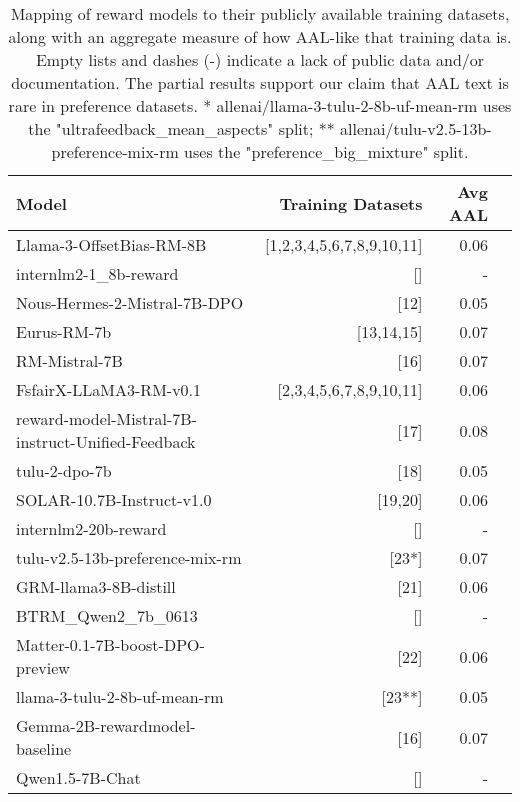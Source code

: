 \begin{table*}[h]
\small
\begin{center}
\begin{tabular}{lrrr}
\toprule
\textbf{Model} & \textbf{Training Datasets} & \textbf{Avg AAL} \\
\midrule
Llama-3-OffsetBias-RM-8B \cite{park2024offsetbias} & [1,2,3,4,5,6,7,8,9,10,11] & 0.06 \\
internlm2-1\_8b-reward \cite{cai2024internlm2} & [] & - \\
Nous-Hermes-2-Mistral-7B-DPO \cite{Nous-Hermes-2-Mistral-7B-DPO} & [12] & 0.05 \\
Eurus-RM-7b \cite{yuan2024advancing} & [13,14,15] & 0.07 \\
RM-Mistral-7B \cite{dong2023raft, xiong2024iterative} & [16] & 0.07 \\
FsfairX-LLaMA3-RM-v0.1 \cite{dong2023raft, xiong2024iterative} & [2,3,4,5,6,7,8,9,10,11] & 0.06 \\
reward-model-Mistral-7B-instruct-Unified-Feedback \cite{yang2024regularizing} & [17] & 0.08 \\
tulu-2-dpo-7b \cite{ivison2023camels} & [18] & 0.05 \\
SOLAR-10.7B-Instruct-v1.0 \cite{kim2023solar, kim2024sdpo} & [19,20] & 0.06 \\
internlm2-20b-reward \cite{cai2024internlm2} & [] & - \\
tulu-v2.5-13b-preference-mix-rm \cite{ivison2024unpacking} & [23*] & 0.07 \\
GRM-llama3-8B-distill \cite{yang2024regularizing} & [21] & 0.06 \\
BTRM\_Qwen2\_7b\_0613 \cite{qwen2} & [] & - \\
Matter-0.1-7B-boost-DPO-preview \cite{jiang2023mistral} & [22] & 0.06 \\
llama-3-tulu-2-8b-uf-mean-rm \cite{ivison2024unpacking} & [23**] & 0.05 \\
Gemma-2B-rewardmodel-baseline \cite{yang2024regularizing} & [16] & 0.07 \\
Qwen1.5-7B-Chat \cite{qwen} & [] & - \\
\bottomrule
\end{tabular}
\caption{Mapping of reward models to their publicly available training datasets, along with an aggregate measure of how AAL-like that training data is. Empty lists and dashes (-) indicate a lack of public data and/or documentation. The partial results support our claim that AAL text is rare in preference datasets. * allenai/llama-3-tulu-2-8b-uf-mean-rm uses the "ultrafeedback\_mean\_aspects" split; ** allenai/tulu-v2.5-13b-preference-mix-rm uses the "preference\_big\_mixture" split.
}
\label{tab:reward-models-training-datasets-mapping}
\end{center}
\end{table*}


